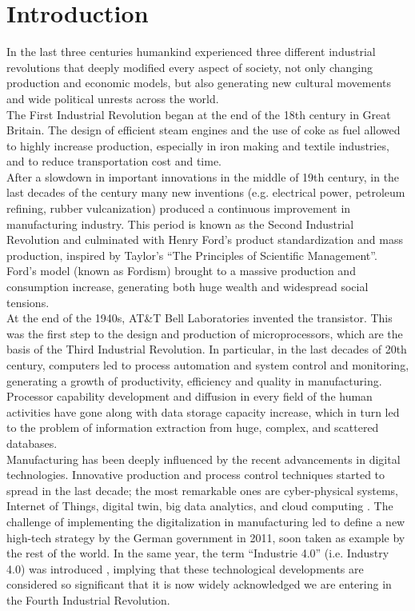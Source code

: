 \chapter{Introduction}
\label{chapter 1}
\ifpdf
    \graphicspath{{Chapter1/Figs/}{Chapter1/Figs/PDF/}{Chapter1/Figs/}}
\else
    \graphicspath{{Chapter1/Figs/Vector/}{Chapter1/Figs/}}
\fi
In the last three centuries humankind experienced three different industrial revolutions that deeply modified every aspect of society, not only changing production and economic models, but also generating new cultural movements and wide political unrests across the world. \\
The First Industrial Revolution began at the end of the 18th century in Great Britain. The design of efficient steam engines and the use of coke as fuel allowed to highly increase production, especially in iron making and textile industries, and to reduce transportation cost and time. \\
After a slowdown in important innovations in the middle of 19th century, in the last decades of the century many new inventions (e.g. electrical power, petroleum refining, rubber vulcanization) produced a continuous improvement in manufacturing industry. This period is known as the Second Industrial Revolution and culminated with Henry Ford’s product standardization and mass production, inspired by Taylor’s “The Principles of Scientific Management”. Ford’s model (known as Fordism) brought to a massive production and consumption increase, generating both huge wealth and widespread social tensions. \\ 
At the end of the 1940s, AT\&T Bell Laboratories invented the transistor. This was the first step to the design and production of microprocessors, which are the basis of the Third Industrial Revolution. In particular, in the last decades of 20th century, computers led to process automation and system control and monitoring, generating a growth of productivity, efficiency and quality in manufacturing. Processor capability development and diffusion in every field of the human activities have gone along with data storage capacity increase, which in turn led to the problem of information extraction from huge, complex, and scattered databases. \\
Manufacturing has been deeply influenced by the recent advancements in digital technologies. Innovative production and process control techniques started to spread in the last decade; the most remarkable ones are cyber-physical systems, Internet of Things, digital twin, big data analytics, and cloud computing \cite{ZhongRayandXuXunandKlotzEberhardandNewmanStephen}. The challenge of implementing the digitalization in manufacturing led to define a new high-tech strategy by the German government in 2011, soon taken as example by the rest of the world. In the same year, the term “Industrie 4.0” (i.e. Industry 4.0) was introduced \cite{WollschlaegerMartin2017TFoI}, implying that these technological developments are considered so significant that it is now widely acknowledged we are entering in the Fourth Industrial Revolution. 
